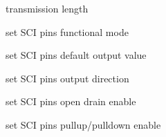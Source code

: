 \begin{DoxyItemize}
\item transmission length ~\newline
~\newline
~\newline
~\newline
~\newline
~\newline
~\newline
~\newline
~\newline
~\newline

\item set S\+CI pins functional mode ~\newline
~\newline
~\newline
~\newline
~\newline
~\newline
~\newline
~\newline
~\newline

\item set S\+CI pins default output value ~\newline
~\newline
~\newline
~\newline
~\newline
~\newline
~\newline
~\newline

\item set S\+CI pins output direction ~\newline
~\newline
~\newline
~\newline
~\newline
~\newline
~\newline

\item set S\+CI pins open drain enable ~\newline
~\newline
~\newline
~\newline
~\newline
~\newline

\item set S\+CI pins pullup/pulldown enable ~\newline
~\newline
~\newline
~\newline
~\newline


\end{DoxyItemize}
